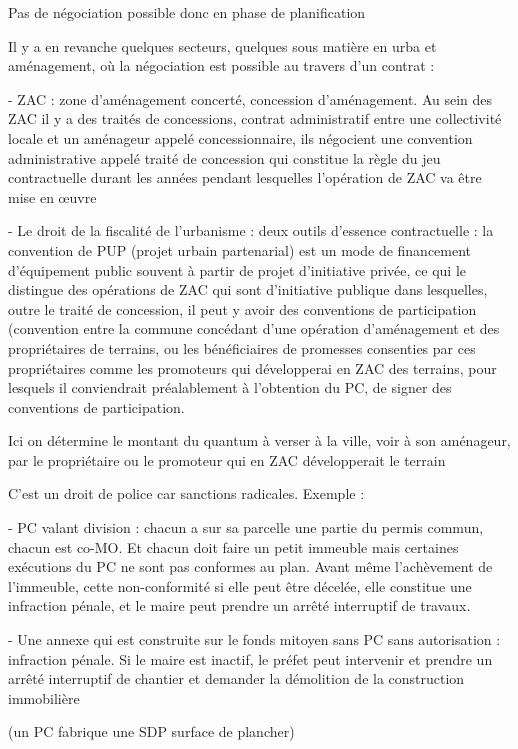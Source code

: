 		Pas de négociation possible donc en phase de planification

		
		Il y a en revanche quelques secteurs, quelques sous matière en urba et aménagement, où la négociation est possible au travers d’un contrat : 

		
		-	ZAC : zone d’aménagement concerté, concession d’aménagement. Au sein des ZAC il y a des traités de concessions, contrat administratif entre une collectivité locale et un aménageur appelé concessionnaire, ils négocient une convention administrative appelé traité de concession qui constitue la règle du jeu contractuelle durant les années pendant lesquelles l’opération de ZAC va être mise en œuvre

		-	Le droit de la fiscalité de l’urbanisme : deux outils d’essence contractuelle : la convention de PUP (projet urbain partenarial) est un mode de financement d’équipement public souvent à partir de projet d’initiative privée, ce qui le distingue des opérations de ZAC qui sont d’initiative publique dans lesquelles, outre le traité de concession, il peut y avoir des conventions de participation (convention entre la commune concédant d’une opération d’aménagement et des propriétaires de terrains, ou les bénéficiaires de promesses consenties par ces propriétaires comme les promoteurs qui développerai en ZAC des terrains, pour lesquels il conviendrait préalablement à l’obtention du PC, de signer des conventions de participation.

		Ici on détermine le montant du quantum à verser à la ville, voir à son aménageur, par le propriétaire ou le promoteur qui en ZAC développerait le terrain

		C’est un droit de police car sanctions radicales. Exemple : 

		-	PC valant division : chacun a sur sa parcelle une partie du permis commun, chacun est co-MO. Et chacun doit faire un petit immeuble mais certaines exécutions du PC ne sont pas conformes au plan. Avant même l’achèvement de l’immeuble, cette non-conformité si elle peut être décelée, elle constitue une infraction pénale, et le maire peut prendre un arrêté interruptif de travaux.

		-	Une annexe qui est construite sur le fonds mitoyen sans PC sans autorisation : infraction pénale. Si le maire est inactif, le préfet peut intervenir et prendre un arrêté interruptif de chantier et demander la démolition de la construction immobilière

		
		(un PC fabrique une SDP surface de plancher)

